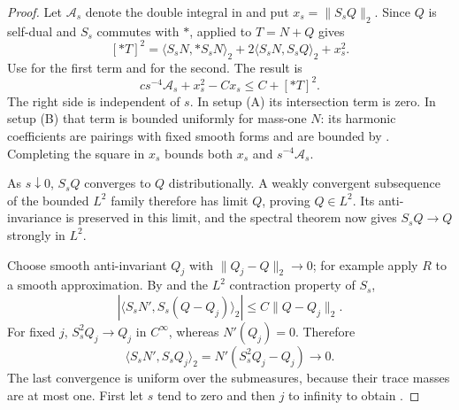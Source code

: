 \begin{proof}
Let $\mathcal A_s$ denote the double integral in
 and put $x_s=\|S_sQ\|_2$.
Since $Q$ is self-dual and $S_s$ commutes with $*$,
 applied to $T=N+Q$ gives
\[
 [*T]^2
  =\langle S_sN,*S_sN\rangle_2
       +2\langle S_sN,S_sQ\rangle_2+x_s^2.
\]
Use  for
the first term and  for the second.  The
result is
\begin{equation}\label{eq:current-energy-coercivity}
 cs^{-4}\mathcal A_s+x_s^2-Cx_s\le C+[*T]^2.
\end{equation}
The right side is independent of $s$.  In setup \textup{(A)} its
intersection term is zero.  In setup \textup{(B)} that term is bounded
uniformly for mass-one $N$: its harmonic coefficients are pairings with
fixed smooth forms and are bounded by .
Completing the square in $x_s$ bounds both $x_s$ and
$s^{-4}\mathcal A_s$.

As $s\downarrow0$, $S_sQ$ converges to $Q$ distributionally.  A weakly
convergent subsequence of the bounded $L^2$ family therefore has limit
$Q$, proving $Q\in L^2$.  Its anti-invariance is preserved in this
limit, and the spectral theorem now gives $S_sQ\to Q$ strongly in $L^2$.

Choose smooth anti-invariant $Q_j$ with $\|Q_j-Q\|_2\to0$; for example
apply $R$ to a smooth approximation.  By
 and the $L^2$ contraction property of
$S_s$,
\[
 |\langle S_sN',S_s(Q-Q_j)\rangle_2|
       \le C\|Q-Q_j\|_2.
\]
For fixed $j$, $S_s^2Q_j\to Q_j$ in $C^\infty$, whereas
$N'(Q_j)=0$.  Therefore
\[
 \langle S_sN',S_sQ_j\rangle_2
       =N'(S_s^2Q_j-Q_j)\longrightarrow0.
\]
The last convergence is uniform over the submeasures, because their
trace masses are at most one.  First let $s$ tend to zero and then $j$
to infinity to obtain .
\end{proof}
